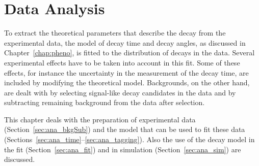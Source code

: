 \chapter{Data Analysis}
\label{chap:ana}

To extract the theoretical parameters that describe the \BstoJpsiKK{} decay from the experimental data, the model of decay time and decay
angles, as discussed in Chapter~\ref{chap:pheno}, is fitted to the distribution of decays in the data. Several experimental effects have to
be taken into account in this fit. Some of these effects, for instance the uncertainty in the measurement of the decay time, are included
by modifying the theoretical model. Backgrounds, on the other hand, are dealt with by selecting signal-like decay candidates in the data
and by subtracting remaining background from the data after selection.

This chapter deals with the preparation of experimental data (Section~\ref{sec:ana_bkgSub}) and the model that can be used to fit these
data (Sections~\ref{sec:ana_time}--\ref{sec:ana_tagging}). Also the use of the decay model in the fit (Section~\ref{sec:ana_fit}) and in
simulation (Section~\ref{sec:ana_sim}) are discussed.








